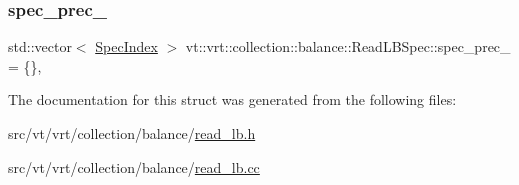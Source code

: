 \subsubsection{\texorpdfstring{spec\+\_\+prec\+\_\+}{spec\_prec\_}}
{\footnotesize\ttfamily std\+::vector$<$ \hyperlink{namespacevt_1_1vrt_1_1collection_1_1balance_a72a5e0d9936ddf57f8e6c64e0e9fd123}{Spec\+Index} $>$ vt\+::vrt\+::collection\+::balance\+::\+Read\+L\+B\+Spec\+::spec\+\_\+prec\+\_\+ = \{\}\hspace{0.3cm}{\ttfamily [static]}, {\ttfamily [private]}}



The documentation for this struct was generated from the following files\+:\begin{DoxyCompactItemize}
\item 
src/vt/vrt/collection/balance/\hyperlink{read__lb_8h}{read\+\_\+lb.\+h}\item 
src/vt/vrt/collection/balance/\hyperlink{read__lb_8cc}{read\+\_\+lb.\+cc}\end{DoxyCompactItemize}
